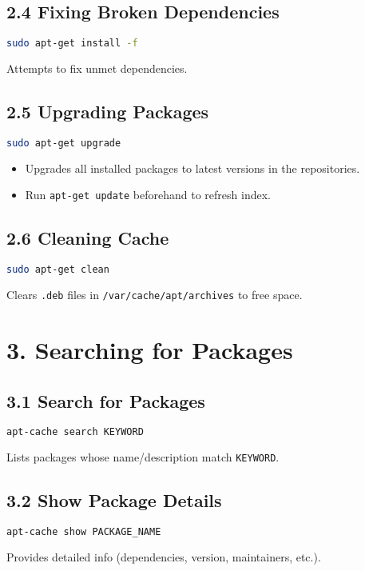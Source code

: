 \documentclass[12pt,a4paper]{report}
\begin{document}
\subsection*{2.4 Fixing Broken Dependencies}
\begin{lstlisting}[language=bash]
sudo apt-get install -f
\end{lstlisting}
Attempts to fix unmet dependencies.

\subsection*{2.5 Upgrading Packages}
\begin{lstlisting}[language=bash]
sudo apt-get upgrade
\end{lstlisting}
\begin{itemize}
    \item Upgrades all installed packages to latest versions in the repositories.  
    \item Run \texttt{apt-get update} beforehand to refresh index.
\end{itemize}

\subsection*{2.6 Cleaning Cache}
\begin{lstlisting}[language=bash]
sudo apt-get clean
\end{lstlisting}
Clears \texttt{.deb} files in \texttt{/var/cache/apt/archives} to free space.

 

\section*{3. Searching for Packages}

\subsection*{3.1 Search for Packages}
\begin{lstlisting}[language=bash]
apt-cache search KEYWORD
\end{lstlisting}
Lists packages whose name/description match \texttt{KEYWORD}.

\subsection*{3.2 Show Package Details}
\begin{lstlisting}[language=bash]
apt-cache show PACKAGE_NAME
\end{lstlisting}
Provides detailed info (dependencies, version, maintainers, etc.).
\end{document}
